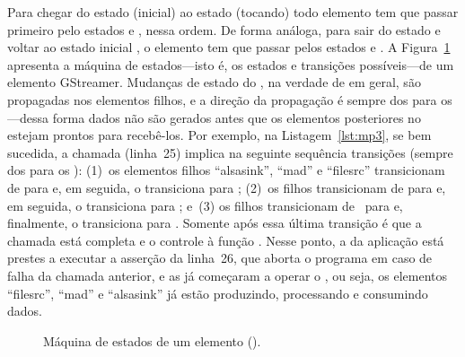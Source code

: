 \documentclass{SBCbookchapter}
\begin{document}
Para chegar do estado  (inicial) ao estado  (tocando) todo
elemento tem que passar primeiro pelo estados  e , nessa
ordem.  De forma análoga, para sair do estado  e voltar ao estado
inicial , o elemento tem que passar pelos estados  e
.  A Figura~\ref{fig:estados-elt} apresenta a máquina de
estados---isto é, os estados e transições possíveis---de um elemento GStreamer.
Mudanças de estado do , na verdade de  em geral, são
propagadas nos elementos filhos, e a direção da propagação é sempre dos
 para os ---dessa forma dados não são gerados antes que
os elementos posteriores no  estejam prontos para recebê-los.  Por
exemplo, na Listagem~\ref{lst:mp3}, se bem sucedida, a chamada
 (linha~25) implica na seguinte sequência transições
(sempre dos  para os ): (1)~os elementos filhos
``alsasink'', ``mad'' e ``filesrc'' transicionam de  para 
e, em seguida, o  transiciona para ; (2)~os filhos
transicionam de  para  e, em seguida, o 
transiciona para ; e~(3) os filhos transicionam de~ para
 e, finalmente, o  transiciona para .
Somente após essa última transição é que a chamada está completa e o controle à
função .  Nesse ponto, a  da aplicação está prestes a
executar a asserção da linha~26, que aborta o programa em caso de falha da
chamada anterior, e as  já começaram a operar o
, ou seja, os elementos ``filesrc'', ``mad'' e ``alsasink'' já
estão produzindo, processando e consumindo dados.

\begin{figure}[h]
  \centering
  \caption{Máquina de estados de um elemento ().}
  \label{fig:estados-elt}
\end{figure}
\end{document}
